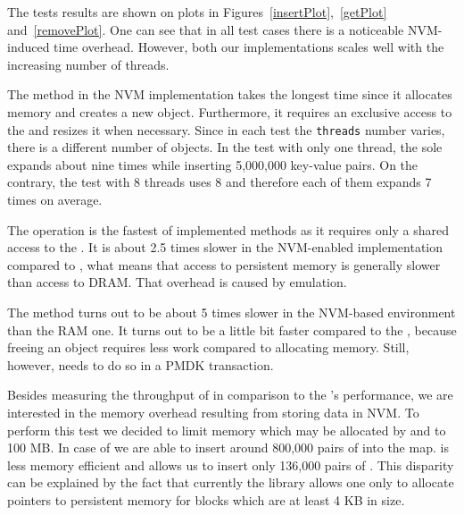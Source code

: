     The tests results are shown on plots in Figures~\ref{insertPlot},~\ref{getPlot} and~\ref{removePlot}. One can see that in all test cases there is a noticeable NVM-induced time overhead. However, both our implementations scales well with the increasing number of threads.
    
    The \insertMethod method in the NVM implementation takes the longest time since it allocates memory and creates a new object. Furthermore, it requires an exclusive access to the \internalHashMap and resizes it when necessary. Since in each test the \texttt{threads} number varies, there is a different number of \internalHashMap objects. In the test with only one thread, the sole \internalHashMap expands about nine times while inserting 5,000,000 key-value pairs. On the contrary, the test with 8 threads uses 8 \internalHashMaps and therefore each of them expands 7 times on average. 
    
    The \getMethod operation is the fastest of implemented methods as it requires only a shared access to the \internalHashMap.
    It is about 2.5 times slower in the NVM-enabled implementation compared to \StandardHashMap, what means that access to persistent memory is generally slower than access to DRAM. 
    That overhead is caused by emulation.
    
    The \removeMethod method turns out to be about 5 times slower in the NVM-based environment than the RAM one. It turns out to be a little bit faster compared to the \insertMethod, because freeing an object requires less work compared to allocating memory. Still, however, \removeMethod needs to do so in a PMDK transaction. 
    
    Besides measuring the throughput of \PHT in comparison to the \StandardHashMap's performance, we are interested in the memory overhead resulting from storing data in NVM. 
    To perform this test we decided to limit memory which may be allocated by \PHT and \StandardHashMap to 100 MB.
    In case of \StandardHashMap we are able to insert around 800,000 pairs of \integersMap into the map. \PHT is less memory efficient and allows us to insert only 136,000 pairs of \integersMap. 
    This disparity can be explained by the fact that currently the \libpmemobjcpp library allows one only to allocate pointers to persistent memory for blocks which are at least 4 KB in size.
    
